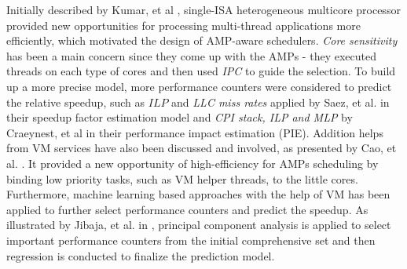 \documentclass[sigplan,review,anonymous]{acmart}\settopmatter{printfolios=true,printccs=false,printacmref=false}
\begin{document}
Initially described by Kumar, et al \cite{kumar2004single,kumar2003single}, single-ISA heterogeneous multicore processor provided new opportunities for processing multi-thread applications more efficiently, which motivated the design of AMP-aware schedulers. {\it Core sensitivity} has been a main concern since they come up with the AMPs - they executed threads on each type of cores and then used {\it IPC} to guide the selection. To build up a more precise model, more performance counters were considered to predict the relative speedup, such as $ILP$ and {\it LLC miss rates} applied by Saez, et al. \cite{saez2012leveraging} in their speedup factor estimation model and {\it CPI stack, ILP and MLP} by Craeynest, et al \cite{van2012scheduling} in their performance impact estimation (PIE). Addition helps from VM services have also been discussed and involved, as presented by Cao, et al. \cite{cao2012yin}. It provided a new opportunity of high-efficiency for AMPs scheduling by binding low priority tasks, such as VM helper threads, to the little cores. Furthermore, machine learning based approaches with the help of VM has been applied to further select performance counters and predict the speedup. As illustrated by Jibaja, et al. in \cite{jibaja2016portable}, principal component analysis is applied to select important performance counters from the initial comprehensive set and then regression is conducted to finalize the prediction model. 
\end{document}
